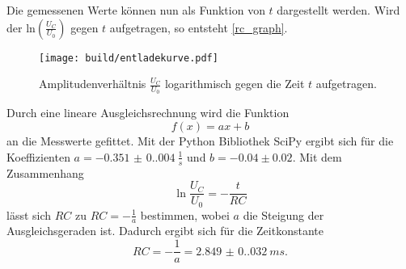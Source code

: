 Die gemessenen Werte können nun als Funktion von $t$ dargestellt werden. Wird der ln$(\frac{U_C}{U_0})$ gegen $t$ aufgetragen, so entsteht \autoref{rc_graph}.
\begin{figure}[H]
    \texttt{[image: build/entladekurve.pdf]}
    \caption{Amplitudenverhältnis $\frac{U_C}{U_0}$ logarithmisch gegen die Zeit $t$ aufgetragen.}
    \label{rc_graph}
\end{figure} 
Durch eine lineare Ausgleichsrechnung wird die Funktion
\begin{equation*}
    f(x) = ax + b
\end{equation*}
an die Messwerte gefittet. Mit der Python Bibliothek SciPy \cite{scipy} ergibt sich für die Koeffizienten $a = \SI{-0.351(0.004)}{\frac{1}{s}}$ und $b = -0.04 \pm 0.02$.
Mit dem Zusammenhang 
\begin{equation*}
    \ln{\frac{U_C}{U_0}} = - \frac{t}{RC}
\end{equation*}
lässt sich $RC$ zu $RC = -\frac{1}{a}$ bestimmen, wobei $a$ die Steigung der Ausgleichsgeraden ist. Dadurch ergibt sich für die Zeitkonstante
\begin{equation*}
    RC = -\frac{1}{a} = \SI{2.849(0.032)}{ms}.
\end{equation*}

